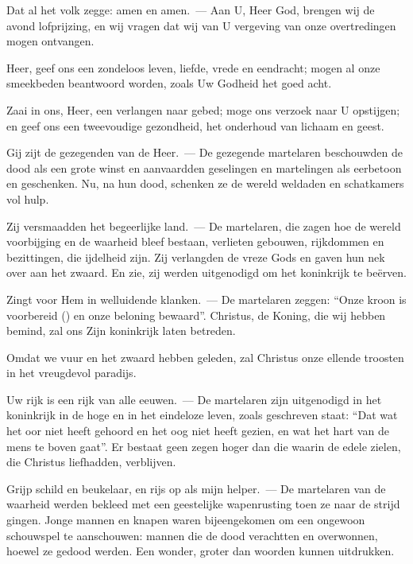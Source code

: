 \documentclass[12pt,twoside,a5paper]{article}
\begin{document}
\begin{halfparskip}
  Dat al het volk zegge: amen en amen.~--- Aan U, Heer God, brengen wij de avond lofprijzing, en wij vragen dat wij van U vergeving van onze overtredingen mogen ontvangen.

  Heer, geef ons een zondeloos leven, liefde, vrede en eendracht; mogen al onze smeekbeden beantwoord worden, zoals Uw Godheid het goed acht.

  Zaai in ons, Heer, een verlangen naar gebed; moge ons verzoek naar U opstijgen; en geef ons een tweevoudige gezondheid, het onderhoud van lichaam en geest.
\end{halfparskip}

\begin{halfparskip}

  Gij zijt de gezegenden van de Heer.~--- De gezegende martelaren beschouwden de dood als een grote winst en aanvaardden geselingen en martelingen als eerbetoon en geschenken. Nu, na hun dood, schenken ze de wereld weldaden en schatkamers vol hulp.

  Zij versmaadden het begeerlijke land.~--- De martelaren, die zagen hoe de wereld voorbijging en de waarheid bleef bestaan, verlieten gebouwen, rijkdommen en bezittingen, die ijdelheid zijn. Zij verlangden de vreze Gods en gaven hun nek over aan het zwaard. En zie, zij werden uitgenodigd om het koninkrijk te beërven.

  Zingt voor Hem in welluidende klanken.~--- De martelaren zeggen: ``Onze kroon is voorbereid () en onze beloning bewaard''. Christus, de Koning, die wij hebben bemind, zal ons Zijn koninkrijk laten betreden.

  Omdat we vuur en het zwaard hebben geleden, zal Christus onze ellende troosten in het vreugdevol paradijs.

  Uw rijk is een rijk van alle eeuwen.~--- De martelaren zijn uitgenodigd in het koninkrijk in de hoge en in het eindeloze leven, zoals geschreven staat: ``Dat wat het oor niet heeft gehoord en het oog niet heeft gezien, en wat het hart van de mens te boven gaat''. Er bestaat geen zegen hoger dan die waarin de edele zielen, die Christus liefhadden, verblijven.

  Grijp schild en beukelaar, en rijs op als mijn helper.~--- De martelaren van de waarheid werden bekleed met een geestelijke wapenrusting toen ze naar de strijd gingen. Jonge mannen en knapen waren bijeengekomen om een ongewoon schouwspel te aanschouwen: mannen die de dood verachtten en overwonnen, hoewel ze gedood werden. Een wonder, groter dan woorden kunnen uitdrukken.


\end{halfparskip}
\end{document}
